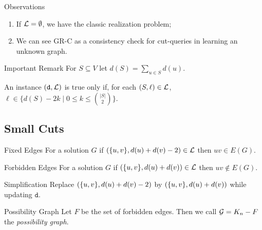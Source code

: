 \begin{frame}{Observations}
    \begin{enumerate}[-]

    \item If $\mathcal{L} = \emptyset$, we have the classic realization problem;


    \item We can see GR-C as a consistency check for cut-queries in learning an unknown graph.

  \end{enumerate}
\end{frame}

\begin{frame}{Important Remark}
    \centering
    For $S \subseteq V$ let $d(S) = \sum\limits_{u \in S} d(u)$.
    \bigbreak
    \pause
    \begin{remark}[1]
        An instance $(\texttt{d}, \mathcal{L})$ is true only if, for each $(S, \ell) \in \mathcal{L}$, $\ell \in \{ d(S) - 2k \mid 0 \leq k \leq \binom{|S|}{2} \}$.
    \end{remark}
\end{frame}

\subsection{Small Cuts}

\begin{frame}{Fixed Edges}
    For a solution $G$ if $(\{u, v\}, d(u) + d(v) - 2) \in \mathcal{L}$ then $uv \in E(G)$.
\end{frame}

\begin{frame}{Forbidden Edges}
    For a solution $G$ if $(\{u, v\}, d(u) + d(v)) \in \mathcal{L}$ then $uv \notin E(G)$.
\end{frame}

\begin{frame}{Simplification}
    Replace $(\{u, v\}, d(u) + d(v) - 2)$ by $(\{u, v\}, d(u) + d(v))$ while updating $\texttt{d}$.
\end{frame}

\begin{frame}{Possibility Graph}
    \centering
    Let $F$ be the set of forbidden edges.
    \pause
    \bigbreak
    Then we call $\mathcal{G} = K_n - F$ the \emph{possibility graph}.
\end{frame}


